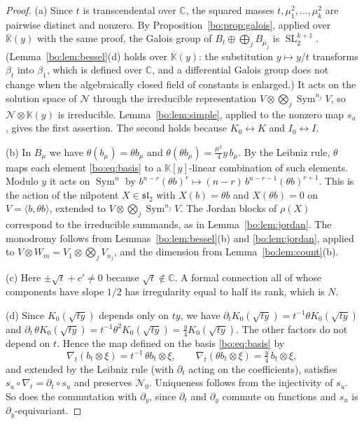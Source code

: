 \documentclass[11pt,a4paper]{article}
\theoremstyle{definition}
\theoremstyle{remark}
\numberwithin{equation}{section}
\newcommand{\C}{\mathbb{C}}
\DeclareMathOperator{\SL}{SL}
\newcommand{\Kt}{\mathbb{K}}
\newcommand{\cN}{\mathcal{N}}
\newcommand{\sltwo}{\mathfrak{sl}_2}
\DeclareMathOperator{\Sym}{Sym}
\begin{document}
\begin{proof}
(a) Since $t$ is transcendental over $\C$, the squared masses $t,\mu_1^2,\dots,\mu_k^2$ are pairwise distinct and nonzero. By Proposition~\ref{bo:prop:galois}, applied over $\overline{\Kt}(y)$ with the same proof, the Galois group of $B_t\oplus\bigoplus_jB_{\mu_j}$ is $\SL_2^{k+1}$. (Lemma~\ref{bo:lem:bessel}(d) holds over $\overline{\Kt}(y)$: the substitution $y\mapsto y/t$ transforms $\beta_t$ into $\beta_1$, which is defined over $\C$, and a differential Galois group does not change when the algebraically closed field of constants is enlarged.) It acts on the solution space of $\cN$ through the irreducible representation $V\otimes\bigotimes_j\Sym^{n_j}V$, so $\cN\otimes\Kt(y)$ is irreducible. Lemma~\ref{bo:lem:simple}, applied to the nonzero map $s_u$, gives the first assertion. The second holds because $K_0\leftrightarrow K$ and $I_0\leftrightarrow I$.

(b) In $B_\mu$ we have $\theta(b_\mu)=\theta b_\mu$ and $\theta(\theta b_\mu)=\tfrac{\mu^2}4y\,b_\mu$. By the Leibniz rule, $\theta$ maps each element \eqref{bo:eq:basis} to a $\Kt[y]$-linear combination of such elements. Modulo $y$ it acts on $\Sym^{n}$ by $b^{n-r}(\theta b)^r\mapsto(n-r)\,b^{n-r-1}(\theta b)^{r+1}$. This is the action of the nilpotent $X\in\sltwo$ with $X(b)=\theta b$ and $X(\theta b)=0$ on $V=\langle b,\theta b\rangle$, extended to $V\otimes\bigotimes_j\Sym^{n_j}V$. The Jordan blocks of $\rho(X)$ correspond to the irreducible summands, as in Lemma~\ref{bo:lem:jordan}. The monodromy follows from Lemmas~\ref{bo:lem:bessel}(b) and \ref{bo:lem:jordan}, applied to $V\otimes W_m=V_1\otimes\bigotimes_jV_{n_j}$, and the dimension from Lemma~\ref{bo:lem:count}(b).

(c) Here $\pm\sqrt t+c'\ne0$ because $\sqrt t\notin\C$. A formal connection all of whose components have slope $1/2$ has irregularity equal to half its rank, which is $N$.

(d) Since $K_0(\sqrt{ty})$ depends only on $ty$, we have $\partial_tK_0(\sqrt{ty})=t^{-1}\theta K_0(\sqrt{ty})$ and $\partial_t\,\theta K_0(\sqrt{ty})=t^{-1}\theta^2K_0(\sqrt{ty})=\tfrac y4K_0(\sqrt{ty})$. The other factors do not depend on $t$. Hence the map defined on the basis \eqref{bo:eq:basis} by
\[
\nabla_t(b_t\otimes\xi)=t^{-1}\,\theta b_t\otimes\xi,\qquad\nabla_t(\theta b_t\otimes\xi)=\tfrac y4\,b_t\otimes\xi,
\]
and extended by the Leibniz rule (with $\partial_t$ acting on the coefficients), satisfies $s_u\circ\nabla_t=\partial_t\circ s_u$ and preserves $\cN_0$. Uniqueness follows from the injectivity of $s_u$. So does the commutation with $\partial_y$, since $\partial_t$ and $\partial_y$ commute on functions and $s_u$ is $\partial_y$-equivariant.
\end{proof}
\end{document}
